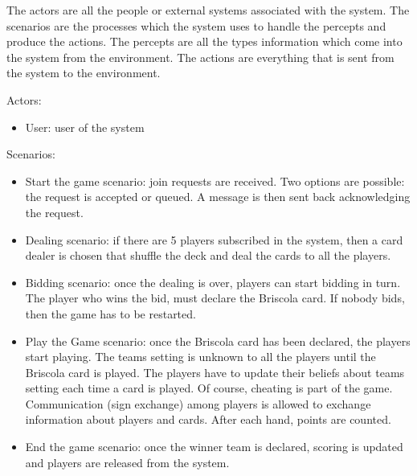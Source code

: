 \documentclass[a4paper]{article}
\begin{document}
The actors are all the people or external systems associated with the system. The scenarios are the processes which the system uses to handle the percepts and produce the actions. The percepts are all the types information which come into the system from the environment. The actions are everything that is sent from the system to the environment.


Actors:
\begin{itemize}
  \item User: user of the system
\end{itemize}

Scenarios:
\begin{itemize}
  \item Start the game scenario: join requests are received. Two options are possible: the request is accepted or queued. A message is then sent back acknowledging the request.
  \item Dealing scenario: if there are 5 players subscribed in the system, then a card dealer is chosen that shuffle the deck and deal the cards to all the players.
  \item Bidding scenario: once the dealing is over, players can start bidding in turn. The player who wins the bid, must declare the Briscola card. If nobody bids, then the game has to be restarted.
  \item Play the Game scenario: once the Briscola card has been declared, the players start playing. The teams setting is unknown to all the players until the Briscola card is played. The players have to update their beliefs about teams setting each time a card is played. Of course, cheating is part of the game. Communication (sign exchange) among players is allowed to exchange information about players and cards. After each hand, points are counted.
  \item End the game scenario: once the winner team is declared, scoring is updated and players are released from the system.
\end{itemize}
\end{document}
